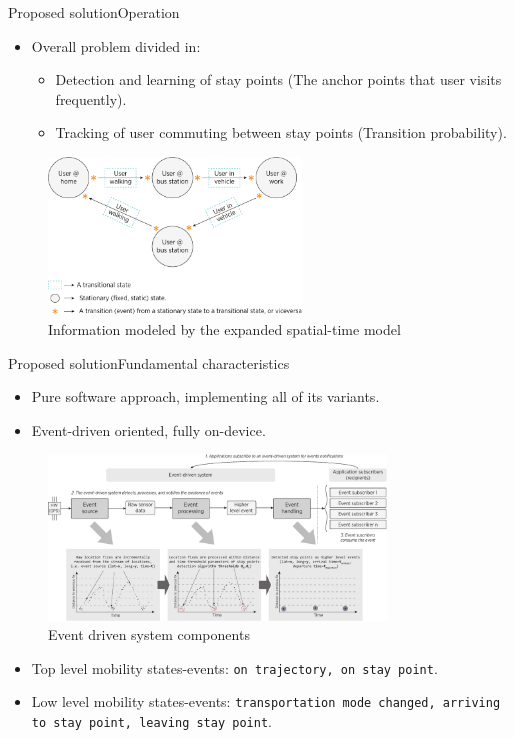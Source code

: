 \documentclass[8pt,xcolor={dvipsnames},handout]{beamer}
\begin{document}
\begin{frame}{Proposed solution}{Operation}
\begin{itemize}
  \item Overall problem divided in:
  \begin{itemize}
    \item Detection and learning of stay points (The anchor points that user visits frequently).
    \pause
    \item Tracking of user commuting between stay points (Transition probability).
  \end{itemize}
\end{itemize}
\pause
\begin{figure}
  \centering
  \includegraphics[width=0.6\textwidth]{vectors/zoom-expanded-spatial-time-model}
  \caption{Information modeled by the expanded spatial-time model}
  \label{fig:information-modeled-spatial-time-model}
\end{figure}
\end{frame}

\begin{frame}{Proposed solution}{Fundamental characteristics}
\small{}
\begin{itemize}
  \item Pure software approach, implementing all of its variants.
  \pause
  \item Event-driven oriented, fully on-device.
\end{itemize}
\begin{figure}
  \centering
  \includegraphics[width=0.8\textwidth]{vectors/event-driven-system}
  \caption{Event driven system components}
  \label{fig:event-driven-system-components}
\end{figure}

\begin{itemize}
    \item Top level mobility states-events: \texttt{\small on trajectory, on stay point}.
    \pause
    \item Low level mobility states-events: \texttt{\small transportation mode changed, arriving to stay point, leaving stay point}.
    \pause
  \end{itemize}
\end{frame}
\end{document}
